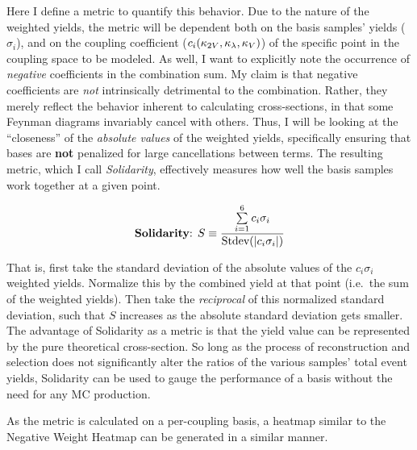     Here I define a metric to quantify this behavior.
    Due to the nature of the weighted yields,
        the metric will be dependent both on the basis samples' yields ($\sigma_i$),
        and on the coupling coefficient ($c_i(\kappa_{2V},\kappa_{\lambda},\kappa_{V})$) of the specific point in the coupling space to be modeled.
    As well, I want to explicitly note the occurrence of \textit{negative} coefficients in the combination sum.
    My claim is that negative coefficients are \textit{not} intrinsically detrimental to the combination.
    Rather, they merely reflect the behavior inherent to calculating cross-sections,
        in that some Feynman diagrams invariably cancel with others.
    Thus, I will be looking at the ``closeness'' of the \textit{absolute values} of the weighted yields,
        specifically ensuring that bases are \textbf{not} penalized for large cancellations between terms.
    The resulting metric, which I call \textit{Solidarity}, effectively measures how well the basis samples work together at a given point.

    \begin{equation}
    \textrm{\textbf{Solidarity}: }S \equiv \frac{ \sum\limits_{i=1}^6 c_i\sigma_i }{ \textrm{Stdev}(|c_i\sigma_i|) }
    \end{equation}

    That is, first take the standard deviation of the absolute values of the $c_i\sigma_i$ weighted yields.
    Normalize this by the combined yield at that point (i.e.\ the sum of the weighted yields).
    Then take the \textit{reciprocal} of this normalized standard deviation,
        such that $S$ increases as the absolute standard deviation gets smaller.
    The advantage of Solidarity as a metric
        is that the yield value can be represented by the pure theoretical cross-section.
    So long as the process of reconstruction and selection does not significantly alter the ratios of the various samples' total event yields,
        Solidarity can be used to gauge the performance of a basis without the need for any MC production.

    As the metric is calculated on a per-coupling basis,
        a heatmap similar to the Negative Weight Heatmap can be generated in a similar manner.

